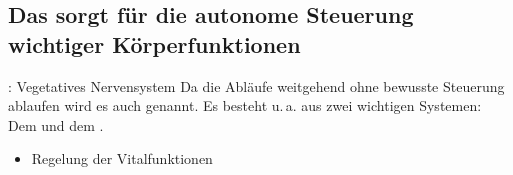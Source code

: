 \subsection{Das  sorgt für die autonome Steuerung wichtiger Körperfunktionen}
\label{topic:vegetatives-nervensystem}
\label{topic:nervensystem-vegetatives}

\TextSlide
{{\TxBeschreibung}: Vegetatives Nervensystem}%
{%
%
Da die Abläufe weitgehend ohne bewusste Steuerung ablaufen
wird es auch 
genannt.
%
Es besteht u.\,a. aus zwei wichtigen Systemen: Dem 
und dem .
}%
{
\begin{itemize}
  \item Regelung der Vitalfunktionen
\end{itemize}
}%


